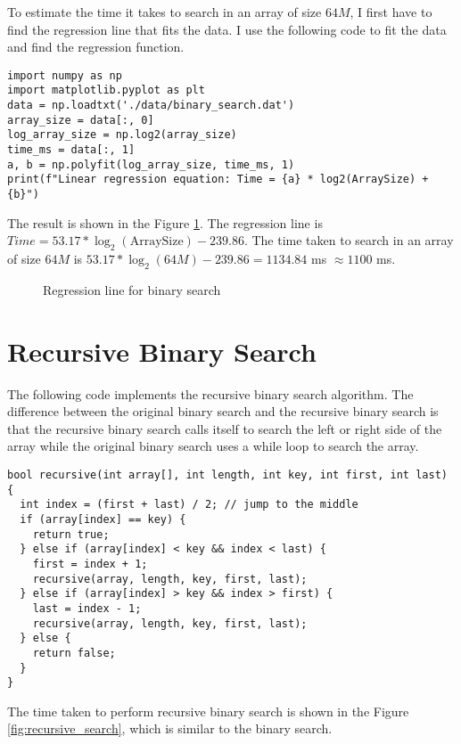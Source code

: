 \documentclass[a4paper,11pt]{article}
\begin{document}
To estimate the time it takes to search in an array of size $64M$, I first have to
find the regression line that fits the data. I use the following code to fit 
the data and find the regression function.

\begin{verbatim}
import numpy as np
import matplotlib.pyplot as plt
data = np.loadtxt('./data/binary_search.dat')
array_size = data[:, 0]
log_array_size = np.log2(array_size)
time_ms = data[:, 1]  
a, b = np.polyfit(log_array_size, time_ms, 1)
print(f"Linear regression equation: Time = {a} * log2(ArraySize) + {b}")
\end{verbatim}

The result is shown in the Figure \ref{fig:regression}. The regression line is
$Time = 53.17 * \log_{2}(\text{ArraySize}) - 239.86$. The time taken to search in an array of size $64M$ is
$53.17 * \log_{2}(64M) - 239.86 = 1134.84$ ms $\approx 1100 $ ms.

\begin{figure}[H]
  \centering
  \resizebox{\linewidth}{!}{
    
  }
  \caption{Regression line for binary search}
  \label{fig:regression}
\end{figure}

\section*{Recursive Binary Search}

The following code implements the recursive binary search algorithm.
The difference between the original binary search and the recursive binary search is that
the recursive binary search calls itself to search the left or right side of the
array while the original binary search uses a while loop to search the array.

\begin{verbatim}
bool recursive(int array[], int length, int key, int first, int last) {
  int index = (first + last) / 2; // jump to the middle
  if (array[index] == key) {
    return true;
  } else if (array[index] < key && index < last) {
    first = index + 1;
    recursive(array, length, key, first, last);
  } else if (array[index] > key && index > first) {
    last = index - 1;
    recursive(array, length, key, first, last);
  } else {
    return false;
  }
}
\end{verbatim}

The time taken to perform recursive binary search is shown in the Figure \ref{fig:recursive_search},
which is similar to the binary search.
\end{document}
